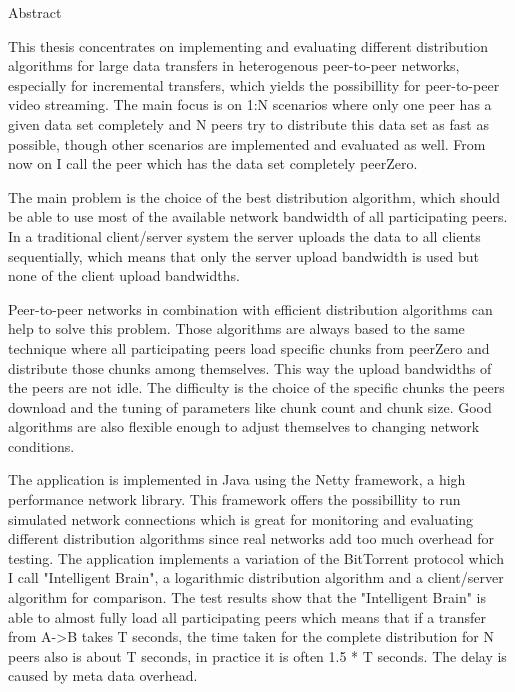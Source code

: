 \begin{center} 
\huge Abstract
\end{center}


This thesis concentrates on implementing and evaluating different distribution algorithms for large data transfers in heterogenous peer-to-peer networks, especially for incremental transfers, which yields the possibillity for peer-to-peer video streaming. The main focus is on 1:N scenarios where only one peer has a given data set completely and N peers try to distribute this data set as fast as possible, though other scenarios are implemented and evaluated as well. From now on I call the peer which has the data set completely peerZero.

The main problem is the choice of the best distribution algorithm, which should be able to use most of the available network bandwidth of all participating peers. In a traditional client/server system the server uploads the data to all clients sequentially, which means that only the server upload bandwidth is used but none of the client upload bandwidths.

Peer-to-peer networks in combination with efficient distribution algorithms can help to solve this problem. Those algorithms are always based to the same technique where all participating peers load specific chunks from peerZero and distribute those chunks among themselves. This way the upload bandwidths of the peers are not idle. The difficulty is the choice of the specific chunks the peers download and the tuning of parameters like chunk count and chunk size. Good algorithms are also flexible enough to adjust themselves to changing network conditions.

The application is implemented in Java using the Netty framework, a high performance network library. This framework offers the possibillity to run simulated network connections which is great for monitoring and evaluating different distribution algorithms since real networks add too much overhead for testing. The application implements a variation of the BitTorrent protocol which I call "Intelligent Brain", a logarithmic distribution algorithm and a client/server algorithm for comparison. The test results show that the "Intelligent Brain" is able to almost fully load all participating peers which means that if a transfer from A->B takes T seconds, the time taken for the complete distribution for N peers also is about T seconds, in practice it is often 1.5 * T seconds. The delay is caused by meta data overhead.
